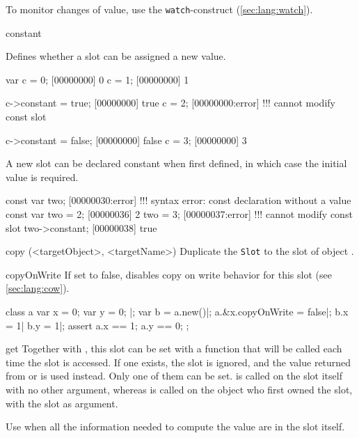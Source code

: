 \begin{urbiscriptapi}
To monitor changes of value, use the \lstinline{watch}-construct
(\autoref{sec:lang:watch}).


\item[constant]

Defines whether a slot can be assigned a new value.

\begin{urbiscript}
var c = 0;
[00000000] 0
c = 1;
[00000000] 1

c->constant = true;
[00000000] true
c = 2;
[00000000:error] !!! cannot modify const slot

c->constant = false;
[00000000] false
c = 3;
[00000000] 3
\end{urbiscript}

A new slot can be declared constant when first defined, in which case the
initial value is required.

\begin{urbiscript}
const var two;
[00000030:error] !!! syntax error: const declaration without a value
const var two = 2;
[00000036] 2
two = 3;
[00000037:error] !!! cannot modify const slot
two->constant;
[00000038] true
\end{urbiscript}

\item[copy](<targetObject>, <targetName>)%
  Duplicate the \lstinline|Slot| to the slot  of object
  .


\item[copyOnWrite]%
  If set to false, disables copy on write behavior for this slot
  (see \autoref{sec:lang:cow}).

\begin{urbiscript}
class a {
  var x = 0;
  var y = 0;
}|;
var b = a.new()|;
a.&x.copyOnWrite = false|;
b.x = 1| b.y = 1|;
assert
{
  a.x == 1;
  a.y == 0;
};
\end{urbiscript}


\item[get]%
  Together with , this slot can be set with a function that will
  be called each time the slot
  is accessed. If one exists, the  slot is ignored, and the
  value returned from  or  is used instead.
  Only one of them can be set.  is called on the slot itself with
  no other argument, whereas  is called on the object who first
  owned the slot, with the slot as argument.

  Use  when all the information needed to compute the value are
  in the slot itself.


\end{urbiscriptapi}

